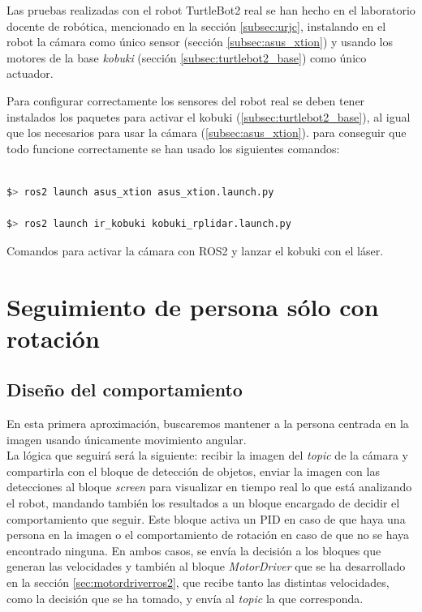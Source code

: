 Las pruebas realizadas con el robot TurtleBot2 real se han hecho en el laboratorio docente de robótica, mencionado en la sección \ref{subsec:urjc},
instalando en el robot la cámara como único sensor (sección \ref{subsec:asus_xtion}) y usando los motores de la base \textit{kobuki}
(sección \ref{subsec:turtlebot2_base}) como único actuador.

Para configurar correctamente los sensores del robot real se deben tener instalados los paquetes para
activar el kobuki (\ref{subsec:turtlebot2_base}), al igual que los necesarios para usar la cámara (\ref{subsec:asus_xtion}).
para conseguir que todo funcione correctamente se han usado los siguientes comandos:

\begin{code}[H]
    \begin{lstlisting}[language=bash]

$> ros2 launch asus_xtion asus_xtion.launch.py

$> ros2 launch ir_kobuki kobuki_rplidar.launch.py
    \end{lstlisting}
    \caption[Comandos para lanzar kobuki y cámara]{Comandos para activar la cámara con ROS2 y lanzar el kobuki con el láser.}
    \label{cod:coms_kobuki_laser_cam}
\end{code}

\section{Seguimiento de persona sólo con rotación}
\label{sec:FP1}

\subsection{Diseño del comportamiento}
\label{subsec:FP1_dis_comp}

En esta primera aproximación, buscaremos mantener a la persona centrada en la imagen usando únicamente movimiento angular.\\

La lógica que seguirá será la siguiente: recibir la imagen del \textit{topic} de la cámara y compartirla con el bloque de detección de objetos,
enviar la imagen con las detecciones al bloque \textit{screen} para visualizar en tiempo real lo que está analizando el robot,
mandando también los resultados a un bloque encargado de decidir el comportamiento que seguir. Este bloque activa un PID en caso
de que haya una persona en la imagen o el comportamiento de rotación en caso de que no se haya encontrado ninguna.
En ambos casos, se envía la decisión a los bloques que generan las velocidades y también al bloque \textit{MotorDriver} que se
ha desarrollado en la sección \ref{sec:motordriverros2}, que recibe tanto las distintas velocidades, como la decisión que se ha tomado, y
envía al \textit{topic} la que corresponda.

